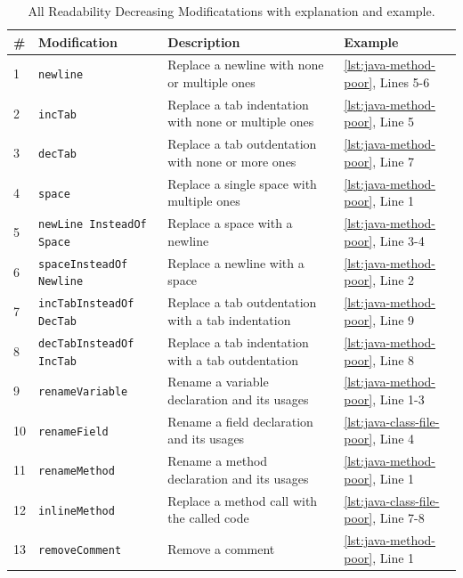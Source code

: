 \documentclass[%
class=scrreprt,
chapterprefix=false,%
open=right,%
twoside=false,%
paper=a4,%
logofile={Logo\_zentral\_farbig\_EN.png},%
thesistype=master,%
UKenglish,%
]{se2thesis}
\theoremstyle{definition}
\newcommand{\RDMs}{Readability Decreasing Modificatations\xspace}
\begin{document}
		\begin{table}[p]
		\centering
		\caption{All \RDMs with explanation and example.}
		\label{tab:rdh-description}
		\begin{tabular}{|p{}|p{}|p{}|p{}|}
			\hline
			\textbf{\#} & \textbf{Modification} & \textbf{Description} & \textbf{Example} \\
			\hline
			1 & \texttt{newline} & Replace a newline with none or multiple ones & \autoref{lst:java-method-poor}, Lines 5-6 \\
			\hline
			2 & \texttt{incTab} & Replace a tab indentation with none or multiple ones & \autoref{lst:java-method-poor}, Line 5 \\
			\hline
			3 & \texttt{decTab} & Replace a tab outdentation with none or more ones & \autoref{lst:java-method-poor}, Line 7 \\
			\hline
			4 & \texttt{space} & Replace a single space with multiple ones & \autoref{lst:java-method-poor}, Line 1 \\
			\hline
			5 & \texttt{newLine InsteadOf Space} & Replace a space with a newline & \autoref{lst:java-method-poor}, Line 3-4 \\
			\hline
			6 & \texttt{spaceInsteadOf Newline} & Replace a newline with a space & \autoref{lst:java-method-poor}, Line 2 \\
			\hline
			7 & \texttt{incTabInsteadOf DecTab} & Replace a tab outdentation with a tab indentation & \autoref{lst:java-method-poor}, Line 9 \\
			\hline
			8 & \texttt{decTabInsteadOf IncTab} & Replace a tab indentation with a tab outdentation & \autoref{lst:java-method-poor}, Line 8 \\
			\hline
			9 & \texttt{renameVariable} & Rename a variable declaration and its usages & \autoref{lst:java-method-poor}, Line 1-3 \\
			\hline
			10 & \texttt{renameField} & Rename a field declaration and its usages & \autoref{lst:java-class-file-poor}, Line 4 \\
			\hline
			11 & \texttt{renameMethod} & Rename a method declaration and its usages & \autoref{lst:java-method-poor}, Line 1 \\
			\hline
			12 & \texttt{inlineMethod} & Replace a method call with the called code & \autoref{lst:java-class-file-poor}, Line 7-8 \\
			\hline
			13 & \texttt{removeComment} & Remove a comment & \autoref{lst:java-method-poor}, Line 1 \\

\end{tabular}
\end{table}
\end{document}

